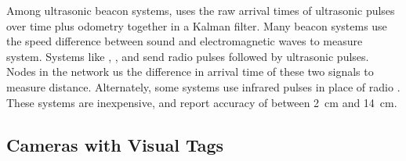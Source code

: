 \documentclass{article}
\begin{document}
    Among ultrasonic beacon systems, \cite{kleeman_optimal_1992} uses the raw arrival times of ultrasonic pulses over time plus odometry together in a Kalman filter. Many beacon systems use the speed difference between sound and electromagnetic waves to measure system. Systems like \cite{smith_tracking_2004}, \cite{ward_new_1997}, and \cite{kim_advanced_2008} send radio pulses followed by ultrasonic pulses. Nodes in the network us the difference in arrival time of these two signals to measure distance. Alternately, some systems use infrared pulses in place of radio \cite{ghidary_new_1999} \cite{yucel_development_2012}. These systems are inexpensive, and report accuracy of between \SI{2}{\centi\meter} and \SI{14}{\centi\meter}.

  \subsection{Cameras with Visual Tags}
\end{document}
